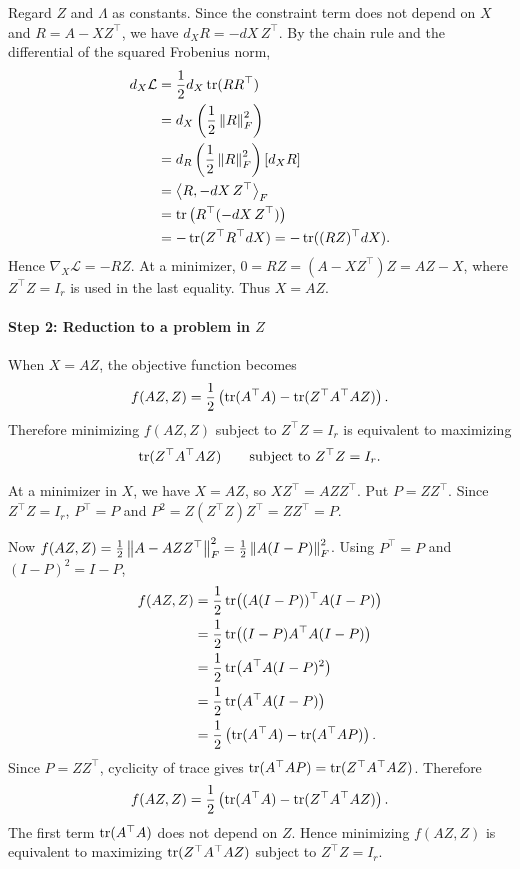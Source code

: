 \begin{pfbox}
Regard $Z$ and $\Lambda$ as constants. Since the constraint term does not
depend on $X$ and $R=A-XZ^{\top}$, we have $d_XR=-dX\,Z^{\top}$. By the
chain rule and the differential of the squared Frobenius norm,
\[
\begin{aligned}
    d_X\mathcal{L}
    &=
    \frac12d_X\operatorname{tr}(RR^{\top})\\
    &=
    d_X\left(\frac12\left\lVert R \right\rVert_F^2\right)\\
    &=
    d_R\left(\frac12\left\lVert R \right\rVert_F^2\right)[d_XR]\\
    &=
    \left\langle R, -dX\,Z^{\top} \right\rangle_F\\
    &=
    \operatorname{tr}\left(R^{\top}(-dX\,Z^{\top})\right)\\
    &=
    -\operatorname{tr}(Z^{\top}R^{\top}dX)
    =
    -\operatorname{tr}((RZ)^{\top}dX).
\end{aligned}
\]
Hence $\nabla_X\mathcal{L}=-RZ$. At a minimizer,
$0=RZ=(A-XZ^{\top})Z=AZ-X$, where $Z^{\top}Z=I_r$ is used in the last
equality. Thus $X=AZ$.
\end{pfbox}

\paragraph*{Step 2: Reduction to a problem in $Z$}

\begin{theorem}
When $X=AZ$, the objective function becomes
\[
    f(AZ,Z)
    =
    \frac{1}{2}\left(\operatorname{tr}(A^{\top}A)-\operatorname{tr}(Z^{\top}A^{\top}AZ)\right).
\]
Therefore minimizing $f(AZ,Z)$ subject to $Z^{\top}Z=I_r$ is equivalent to maximizing
\[
    \operatorname{tr}(Z^{\top}A^{\top}AZ)
    \qquad\text{subject to }Z^{\top}Z=I_r.
\]
\end{theorem}

\begin{pfbox}
At a minimizer in $X$, we have $X=AZ$, so
$XZ^{\top}=AZZ^{\top}$. Put $P=ZZ^{\top}$. Since $Z^{\top}Z=I_r$,
$P^{\top}=P$ and $P^2=Z(Z^{\top}Z)Z^{\top}=ZZ^{\top}=P$.

Now $f(AZ,Z)=\frac12\left\lVert A-AZZ^{\top} \right\rVert_F^2
=\frac12\left\lVert A(I-P) \right\rVert_F^2$. Using $P^{\top}=P$ and $(I-P)^2=I-P$,
\[
\begin{aligned}
    f(AZ,Z)
    &=
    \frac{1}{2}\operatorname{tr}\bigl((A(I-P))^{\top}A(I-P)\bigr)\\
    &=
    \frac{1}{2}\operatorname{tr}\bigl((I-P)A^{\top}A(I-P)\bigr)\\
    &=
    \frac{1}{2}\operatorname{tr}\bigl(A^{\top}A(I-P)^2\bigr)\\
    &=
    \frac{1}{2}\operatorname{tr}\bigl(A^{\top}A(I-P)\bigr)\\
    &=
    \frac{1}{2}\left(\operatorname{tr}(A^{\top}A)-\operatorname{tr}(A^{\top}AP)\right).
\end{aligned}
\]
Since $P=ZZ^{\top}$, cyclicity of trace gives
$\operatorname{tr}(A^{\top}AP)=\operatorname{tr}(Z^{\top}A^{\top}AZ)$. Therefore
\[
    f(AZ,Z)
    =
    \frac{1}{2}\left(\operatorname{tr}(A^{\top}A)-\operatorname{tr}(Z^{\top}A^{\top}AZ)\right).
\]
The first term $\operatorname{tr}(A^{\top}A)$ does not depend on $Z$. Hence minimizing $f(AZ,Z)$ is equivalent to maximizing $\operatorname{tr}(Z^{\top}A^{\top}AZ)$ subject to $Z^{\top}Z=I_r$.
\end{pfbox}



